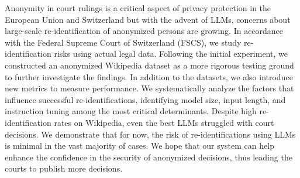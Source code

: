 Anonymity in court rulings is a critical aspect of privacy protection in the European Union and Switzerland but with the advent of LLMs, concerns about large-scale re-identification of anonymized persons are growing. In accordance with the Federal Supreme Court of Switzerland (FSCS), we study re-identification risks using actual legal data. Following the initial experiment, we constructed an anonymized Wikipedia dataset as a more rigorous testing ground to further investigate the findings. In addition to the datasets, we also introduce new metrics to measure performance. We systematically analyze the factors that influence successful re-identifications, identifying model size, input length, and instruction tuning among the most critical determinants. Despite high re-identification rates on Wikipedia, even the best LLMs struggled with court decisions. We demonstrate that for now, the risk of re-identifications using LLMs is minimal in the vast majority of cases. We hope that our system can help enhance the confidence in the security of anonymized decisions, thus leading the courts to publish more decisions.